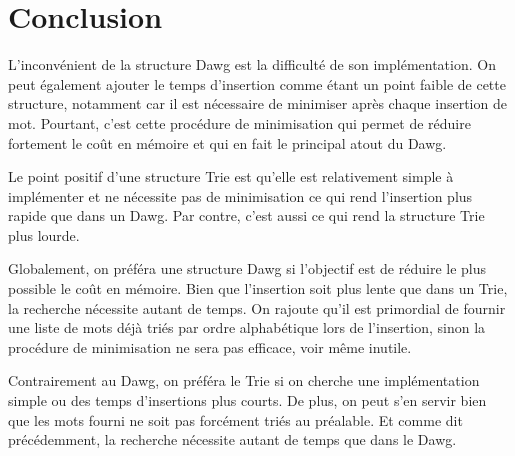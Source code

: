 \chapter{Conclusion}

L'inconvénient de la structure Dawg est la difficulté de son implémentation.
On peut également ajouter le temps d'insertion comme étant un point faible de cette structure, notamment car il est nécessaire de minimiser après chaque insertion de mot.
\smallskip \newline Pourtant, c'est cette procédure de minimisation qui permet de réduire fortement le coût en mémoire et qui en fait le principal atout du Dawg.

Le point positif d'une structure Trie est qu'elle est relativement simple à implémenter et ne nécessite pas de minimisation ce qui rend l'insertion plus rapide que dans un Dawg.
\smallskip \newline Par contre, c'est aussi ce qui rend la structure Trie plus lourde.

Globalement, on préféra une structure Dawg si l'objectif est de réduire le plus possible le coût en mémoire. Bien que l'insertion soit plus lente que dans un Trie, la recherche nécessite autant de temps.
\smallskip \newline On rajoute qu'il est primordial de fournir une liste de mots déjà triés par ordre alphabétique lors de l'insertion, sinon la procédure de minimisation ne sera pas efficace, voir même inutile.

Contrairement au Dawg, on préféra le Trie si on cherche une implémentation simple ou des temps d'insertions plus courts. De plus, on peut s'en servir bien que les mots fourni ne soit pas forcément triés au préalable. Et comme dit précédemment, la recherche nécessite autant de temps que dans le Dawg.